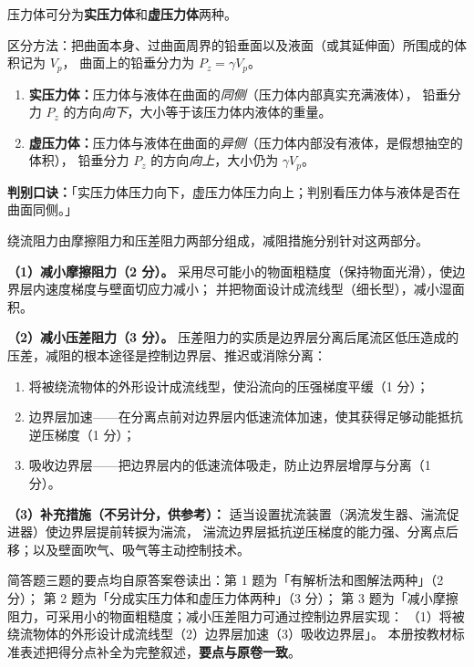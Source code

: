 \begin{jie}
压力体可分为\textbf{实压力体}和\textbf{虚压力体}两种。

区分方法：把曲面本身、过曲面周界的铅垂面以及液面（或其延伸面）所围成的体积记为 $V_p$，
曲面上的铅垂分力为 $P_z=\gamma V_p$。

\begin{enumerate}
  \item \textbf{实压力体：}压力体与液体在曲面的\emph{同侧}（压力体内部真实充满液体），
        铅垂分力 $P_z$ 的方向\emph{向下}，大小等于该压力体内液体的重量。
  \item \textbf{虚压力体：}压力体与液体在曲面的\emph{异侧}（压力体内部没有液体，是假想抽空的体积），
        铅垂分力 $P_z$ 的方向\emph{向上}，大小仍为 $\gamma V_p$。
\end{enumerate}

\textbf{判别口诀：}「实压力体压力向下，虚压力体压力向上；判别看压力体与液体是否在曲面同侧。」
\end{jie}


\begin{jie}
绕流阻力由摩擦阻力和压差阻力两部分组成，减阻措施分别针对这两部分。

\textbf{（1）减小摩擦阻力（2 分）。}
采用尽可能小的物面粗糙度（保持物面光滑），使边界层内速度梯度与壁面切应力减小；
并把物面设计成流线型（细长型），减小湿面积。

\textbf{（2）减小压差阻力（3 分）。}
压差阻力的实质是边界层分离后尾流区低压造成的压差，减阻的根本途径是控制边界层、推迟或消除分离：
\begin{enumerate}
  \item 将被绕流物体的外形设计成流线型，使沿流向的压强梯度平缓（1 分）；
  \item 边界层加速——在分离点前对边界层内低速流体加速，使其获得足够动能抵抗逆压梯度（1 分）；
  \item 吸收边界层——把边界层内的低速流体吸走，防止边界层增厚与分离（1 分）。
\end{enumerate}

\textbf{（3）补充措施（不另计分，供参考）：}
适当设置扰流装置（涡流发生器、湍流促进器）使边界层提前转捩为湍流，
湍流边界层抵抗逆压梯度的能力强、分离点后移；以及壁面吹气、吸气等主动控制技术。
\end{jie}

\begin{tishi}
简答题三题的要点均自原答案卷读出：第 1 题为「有解析法和图解法两种」（2 分）；
第 2 题为「分成实压力体和虚压力体两种」（3 分）；
第 3 题为「减小摩擦阻力，可采用小的物面粗糙度；减小压差阻力可通过控制边界层实现：
（1）将被绕流物体的外形设计成流线型（2）边界层加速（3）吸收边界层」。
本册按教材标准表述把得分点补全为完整叙述，\textbf{要点与原卷一致}。
\end{tishi}

